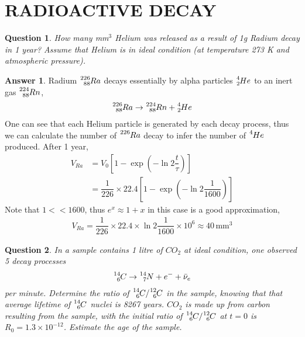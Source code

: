 \documentclass[12pt]{paper}
\numberwithin{equation}{section}
\newtheorem{question}{Question}
\theoremstyle{definition}
\newtheorem*{answer}{Answer}
\numberwithin{equation}{section}
\begin{document}
\section{RADIOACTIVE DECAY}
\begin{question}
    How many mm$^3$ Helium was released as a result of 1g Radium decay in 1 year? Assume that Helium is in ideal condition (at temperature 273 K and atmospheric pressure).
\end{question}
\begin{answer}
    Radium $\ce{^226_88}Ra$ decays essentially by alpha particles $\ce{^4_2}He$ to an inert gas $\ce{^224_88}Rn$,
    \begin{align}
        \ce{^226_88}Ra \rightarrow \ce{^224_88}Rn + \ce{^4_2}He
    \end{align}
    One can see that each Helium particle is generated by each decay process, thus we can calculate the number of $\ce{^226}Ra$ decay to infer the number of $\ce{^4}He$ produced. After 1 year,
    \begin{align} 
        V_{Ra} &= V_0\left[1-\exp\left(-\ln2\dfrac{t}{\tau}\right)\right] \\
        &= \dfrac{1}{226}\times 22.4\left[1-\exp\left(-\ln2\dfrac{1}{1600}\right)\right]
    \end{align}
    Note that $1<<1600$, thus $e^x\approx 1+x$ in this case is a good approximation,
    \begin{align} 
        V_{Ra} = \dfrac{1}{226}\times 22.4\times\ln2\dfrac{1}{1600}\times 10^6\approx 40\,\text{mm}^3
    \end{align}
\end{answer}
\begin{question}
    In a sample contains 1 litre of $CO_2$ at ideal condition, one observed 5 decay processes
    \begin{align} 
        \ce{^14_6}C \rightarrow \ce{^14_7}N + e^- + \bar{\nu}_e
    \end{align}
    per minute. Determine the ratio of $\ce{^14_6}C/\ce{^12_6}C$ in the sample, knowing that that average lifetime of $\ce{^14_6}C$ nuclei is 8267 years. $CO_2$ is made up from carbon resulting from the sample, with the initial ratio of $\ce{^14_6}C/\ce{^12_6}C$ at $t=0$ is $R_0=1.3\times 10^{-12}$. Estimate the age of the sample.
\end{question}
\end{document}
